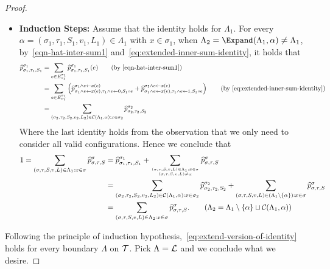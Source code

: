 \documentclass[11pt]{article}
\newcommand{\set}[1]{\left\{#1\right\}}
\newcommand{\wh}[1]{\widehat{#1}}
\begin{document}
\begin{proof}
\begin{itemize}
        \item \textbf{Induction Steps:} Assume that the identity holds for $\Lambda_1$. For every $\alpha = (\sigma_1, \tau_1, S_1, v_1, L_1) \in \Lambda_1$ with $x \in \sigma_1$, when $\Lambda_2 = \Expand(\Lambda_1, \alpha) \neq \Lambda_1$, by~\eqref{eqn-hat-inter-sum1} and~\eqref{eq:extended-inner-sum-identity}, it holds that
        \begin{align*}
            \wh{p}_{\sigma_1, \tau_1, S_1}^{\sigma_1} &= \sum_{e \in E_{v_1}^{\sigma_1}} \wh{p}_{\sigma_1, \tau_1, S_1}^{\sigma_1}(e) \tag{by~\eqref{eqn-hat-inter-sum1}}\\
            &= \sum_{e \in E_{v_1}^{\sigma_1}} \left(\wh{p}_{\sigma_1 \wedge e \gets x(e), \tau_1 \wedge e \gets 0, S_1 \circ e}^{\sigma_1 \wedge e \gets x(e)} + \widehat{p}_{\sigma_1 \wedge e \gets x(e), \tau_1 \wedge e \gets 1, S_1 \circ e}^{\sigma_1 \wedge e \gets x(e)}\right) \tag{by~\eqref{eq:extended-inner-sum-identity}} \\
            &= \sum_{(\sigma_2, \tau_2, S_2, v_2, L_2) \in \+C(\Lambda_1, \alpha) : x \in \sigma_2} \wh{p}_{\sigma_2, \tau_2, S_2}^{\sigma_2}
        \end{align*}
        Where the last identity holds from the observation that we only need to consider all valid configurations. Hence we conclude that
        \begin{align*}
            1 = \sum_{(\sigma, \tau, S, v, L) \in \Lambda_1 : x \in \sigma} \wh{p}_{\sigma, \tau, S}^{\sigma} &= \wh{p}_{\sigma_1, \tau_1, S_1}^{\sigma_1} + \sum_{(\sigma, \tau, S, v, L) \in \Lambda_1 : x \in \sigma \atop (\sigma, \tau, S, v, L) \neq \alpha} \wh{p}_{\sigma, \tau, S}^{\sigma} \\
            &= \sum_{(\sigma_2, \tau_2, S_2, v_2, L_2) \in \+C(\Lambda_1, \alpha) : x \in \sigma_2} \wh{p}_{\sigma_2, \tau_2, S_2}^{\sigma_2} + \sum_{(\sigma, \tau, S, v, L) \in (\Lambda_1 \setminus \set{\alpha}) : x \in \sigma} \wh{p}_{\sigma, \tau, S}^{\sigma} \\
            &= \sum_{(\sigma, \tau, S, v, L) \in \Lambda_2 : x \in \sigma} \wh{p}_{\sigma, \tau, S}^{\sigma}. \tag{$\Lambda_2 = \Lambda_1 \setminus \set{\alpha} \sqcup \+C(\Lambda_1, \alpha)$}
        \end{align*}
    \end{itemize}
    Following the principle of induction hypothesis,~\eqref{eq:extend-version-of-identity} holds for every boundary $\Lambda$ on $\mathcal{T}$. Pick $\Lambda = \mathcal{L}$ and we conclude what we desire.
    \fi
\end{proof}
\end{document}
